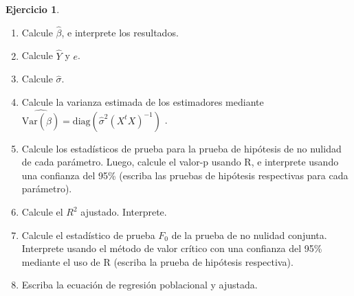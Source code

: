 \documentclass[
  11pt,
]{book}
\providecommand{\tightlist}{%
  \setlength{\itemsep}{0pt}\setlength{\parskip}{0pt}}
\theoremstyle{definition}
\theoremstyle{definition}
\theoremstyle{definition}
\newtheorem{exercise}{Ejercicio}[chapter]
\theoremstyle{definition}
\theoremstyle{remark}
\begin{document}
\begin{exercise}
\begin{enumerate}
\def\labelenumi{\arabic{enumi}.}
\tightlist
\item
  Calcule \(\widehat\beta\), e interprete los resultados.
\item
  Calcule \(\widehat{Y}\) y \(e\).
\item
  Calcule \(\widehat\sigma\).
\item
  Calcule la varianza estimada de los estimadores mediante \(\widehat{\mathrm{Var}(\hat{\beta})} = \text{diag}(\widehat\sigma^2 (X^tX)^{-1})\) .
\item
  Calcule los estadísticos de prueba para la prueba de hipótesis de no nulidad de cada parámetro. Luego, calcule el valor-p usando R, e interprete usando una confianza del 95\% (escriba las pruebas de hipótesis respectivas para cada parámetro).
\item
  Calcule el \(R^2\) ajustado. Interprete.
\item
  Calcule el estadístico de prueba \(F_0\) de la prueba de no nulidad conjunta. Interprete usando el método de valor crítico con una confianza del 95\% mediante el uso de R (escriba la prueba de hipótesis respectiva).
\item
  Escriba la ecuación de regresión poblacional y ajustada.
\end{enumerate}

\end{exercise}
\end{document}
